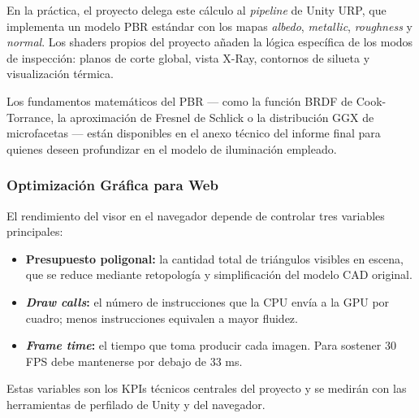 En la pr\'actica, el proyecto delega este c\'alculo al \textit{pipeline} de Unity URP, que implementa un modelo PBR est\'andar con los mapas \textit{albedo}, \textit{metallic}, \textit{roughness} y \textit{normal}. Los shaders propios del proyecto a\~naden la l\'ogica espec\'ifica de los modos de inspecci\'on: planos de corte global, vista X-Ray, contornos de silueta y visualizaci\'on t\'ermica.

Los fundamentos matem\'aticos del PBR — como la funci\'on BRDF de Cook-Torrance, la aproximaci\'on de Fresnel de Schlick o la distribuci\'on GGX de microfacetas — est\'an disponibles en el anexo t\'ecnico del informe final para quienes deseen profundizar en el modelo de iluminaci\'on empleado.

\subsubsection{Optimizaci\'on Gr\'afica para Web}

El rendimiento del visor en el navegador depende de controlar tres variables principales:

\begin{itemize}
    \item \textbf{Presupuesto poligonal:} la cantidad total de tri\'angulos visibles en escena, que se reduce mediante retopolog\'ia y simplificaci\'on del modelo CAD original.
    \item \textbf{\textit{Draw calls}:} el n\'umero de instrucciones que la CPU env\'ia a la GPU por cuadro; menos instrucciones equivalen a mayor fluidez.
    \item \textbf{\textit{Frame time}:} el tiempo que toma producir cada imagen. Para sostener 30 FPS debe mantenerse por debajo de 33 ms.
\end{itemize}

Estas variables son los KPIs t\'ecnicos centrales del proyecto y se medir\'an con las herramientas de perfilado de Unity y del navegador.

\newpage
